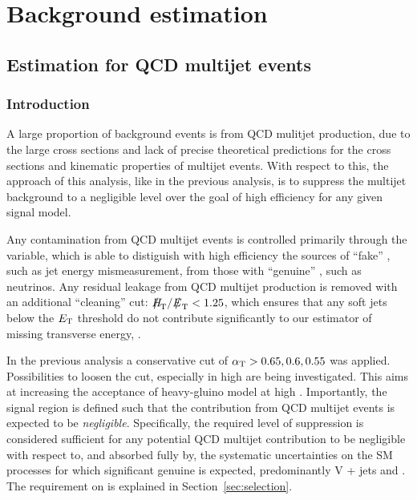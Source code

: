 \section{Background estimation}
\label{sec:background}

\subsection{Estimation for QCD multijet events}
\subsubsection{Introduction}

A large proportion of background events is from QCD mulitjet production, due to the large cross sections and lack of precise theoretical
predictions for the cross sections and kinematic properties of multijet events. With respect to this, the approach of this analysis, like in the previous analysis, is to suppress the multijet background to a negligible level over the goal of high efficiency for any given signal model.
 
Any contamination from QCD multijet events is controlled primarily through the \alphat variable, which is able to distiguish with high efficiency the sources of ``fake'' \met, such as jet energy mismeasurement, from those with ``genuine'' \met, such as neutrinos. Any residual leakage from QCD multijet production is removed with an additional ``\met cleaning'' cut: $\mhtmet < 1.25$, which ensures that any soft jets below the ${E_{\text T}}$ threshold do not contribute significantly to our estimator of missing transverse energy, \mht.

In the previous analysis a conservative cut of $\alpha_{\text{T}} > 0.65,0.6,0.55$ was applied. Possibilities to loosen the \alphat cut, especially in high \scalht are being investigated. This aims at increasing the acceptance of heavy-gluino model at high \scalht. Importantly, the signal region is defined such that the contribution from QCD multijet events is expected to be {\it negligible}. Specifically, the required level of suppression is considered sufficient for any potential QCD multijet contribution to be negligible with respect to, and absorbed fully by, the systematic uncertainties on the SM processes for which significant genuine \met is expected, predominantly V + jets and \ttbar. The requirement on \alphat is explained in Section~\ref{sec:selection}.

